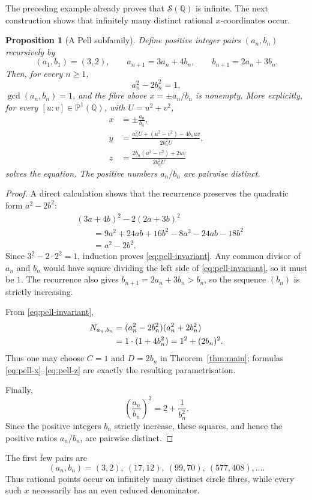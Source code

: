 \documentclass[11pt]{article}
\numberwithin{equation}{section}
\newtheorem{proposition}[theorem]{Proposition}
\theoremstyle{definition}
\theoremstyle{remark}
\newcommand{\Q}{\mathbb{Q}}
\newcommand{\Pone}{\mathbb{P}^{1}}
\begin{document}
The preceding example already proves that $\mathcal S(\Q)$ is infinite.
The next construction shows that infinitely many distinct rational
$x$-coordinates occur.

\begin{proposition}[A Pell subfamily]\label{prop:pell-family}
Define positive integer pairs $(a_n,b_n)$ recursively by
\begin{equation}\label{eq:pell-recurrence}
 (a_1,b_1)=(3,2),
 \qquad
 a_{n+1}=3a_n+4b_n,
 \qquad
 b_{n+1}=2a_n+3b_n.
\end{equation}
Then, for every $n\ge1$,
\begin{equation}\label{eq:pell-invariant}
 a_n^{2}-2b_n^{2}=1,
\end{equation}
$\gcd(a_n,b_n)=1$, and the fibre above $x=\pm a_n/b_n$ is nonempty.
More explicitly, for every $[u:v]\in\Pone(\Q)$, with
$U=u^{2}+v^{2}$,
\begin{align}
 x&=\pm\frac{a_n}{b_n},\label{eq:pell-x}\\
 y&=\frac{a_n^{2}U+(u^{2}-v^{2})-4b_nuv}
 {2b_n^{2}U},\label{eq:pell-y}\\
 z&=\frac{2b_n(u^{2}-v^{2})+2uv}
 {2b_n^{2}U}\label{eq:pell-z}
\end{align}
solves the equation.  The positive numbers $a_n/b_n$ are pairwise
distinct.
\end{proposition}

\begin{proof}
A direct calculation shows that the recurrence preserves the quadratic
form $a^{2}-2b^{2}$:
\begin{align*}
 &(3a+4b)^{2}-2(2a+3b)^{2}\\
 &\qquad=9a^{2}+24ab+16b^{2}
 -8a^{2}-24ab-18b^{2}\\
 &\qquad=a^{2}-2b^{2}.
\end{align*}
Since $3^{2}-2\cdot2^{2}=1$, induction proves
\eqref{eq:pell-invariant}.  Any common divisor of $a_n$ and $b_n$ would
have square dividing the left side of \eqref{eq:pell-invariant}, so it
must be $1$.  The recurrence also gives
$b_{n+1}=2a_n+3b_n>b_n$, so the sequence $(b_n)$ is strictly increasing.

From \eqref{eq:pell-invariant},
\begin{align}
 N_{a_n,b_n}
 &=(a_n^{2}-2b_n^{2})(a_n^{2}+2b_n^{2})\notag\\
 &=1\cdot(1+4b_n^{2})
 =1^{2}+(2b_n)^{2}.\label{eq:pell-N}
\end{align}
Thus one may choose $C=1$ and $D=2b_n$ in
Theorem~\ref{thm:main}; formulas
\eqref{eq:pell-x}--\eqref{eq:pell-z} are exactly the resulting
parametrisation.

Finally,
\[
 \left(\frac{a_n}{b_n}\right)^{2}
 =2+\frac{1}{b_n^{2}}.
\]
Since the positive integers $b_n$ strictly increase, these squares, and
hence the positive ratios $a_n/b_n$, are pairwise distinct.
\end{proof}

The first few pairs are
\[
 (a_n,b_n)=(3,2),\ (17,12),\ (99,70),\ (577,408),\ldots.
\]
Thus rational points occur on infinitely many distinct circle fibres,
while every such $x$ necessarily has an even reduced denominator.
\end{document}
